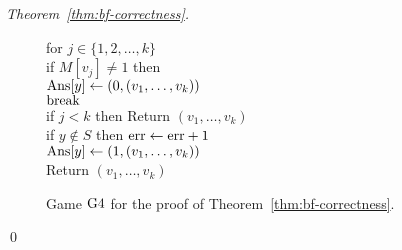 \begin{proof}[Theorem~\ref{thm:bf-correctness}]
\begin{figure}[tp]
{{for $j \in \{1,2,\ldots,k\}$\\
\nudge if $M[v_j] \neq 1$ then \\
\nudge \nudge $\mathrm{Ans}[y] \gets (0, (v_1, \ldots, v_{k}) )$\\
\nudge \nudge $\mathrm{break}$\\
if $j < k$ then Return $\left(v_1,\ldots,v_k\right)$\\
if $y \not\in S$ then $\mathrm{err} \gets \mathrm{err} +1$\\
$\mathrm{Ans}[y] \gets (1, (v_1, \ldots, v_{k}))$\\
Return $\left(v_1,\ldots,v_k\right)$
}
}
\caption{Game $\text{G4}$ for the
proof of Theorem~\ref{thm:bf-correctness}.}
\label{fig:bf-correctness-games2}
\end{figure}
\hfill\qed
\end{proof}
